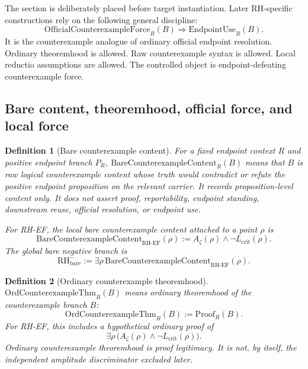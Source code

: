 \documentclass[11pt]{article}
\newtheorem{definition}{Definition}[section]
\newcommand{\Az}{A_{\zeta}}
\newcommand{\Lcrit}{L_{\mathrm{crit}}}
\newcommand{\RH}{\mathrm{RH}}
\newcommand{\EF}{\mathrm{EF}}
\newcommand{\EndpointUse}{\mathrm{EndpointUse}}
\newcommand{\BareCx}{\mathrm{BareCounterexampleContent}}
\newcommand{\OrdCxThm}{\mathrm{OrdCounterexampleThm}}
\newcommand{\OfficialCxForce}{\mathrm{OfficialCounterexampleForce}}
\begin{document}
The section is deliberately placed before target instantiation. Later RH-specific constructions rely on the following general discipline:
\[
\OfficialCxForce_R(B)\Rightarrow\EndpointUse_R(B).
\]
It is the counterexample analogue of ordinary official endpoint resolution. Ordinary theoremhood is allowed. Raw counterexample syntax is allowed. Local reductio assumptions are allowed. The controlled object is endpoint-defeating counterexample force.

\subsection{Bare content, theoremhood, official force, and local force}

\begin{definition}[Bare counterexample content]
For a fixed endpoint context \(R\) and positive endpoint branch \(P_R\), \(\BareCx_R(B)\) means that \(B\) is raw logical counterexample content whose truth would contradict or refute the positive endpoint proposition on the relevant carrier. It records proposition-level content only. It does not assert proof, reportability, endpoint standing, downstream reuse, official resolution, or endpoint use.

For RH-EF, the local bare counterexample content attached to a point \(\rho\) is
\[
\BareCx_{\RH\text{-}\EF}(\rho):=\Az(\rho)\wedge\neg\Lcrit(\rho).
\]
The global bare negative branch is
\[
\RH^-_{\mathrm{bare}}:=\exists \rho\,\BareCx_{\RH\text{-}\EF}(\rho).
\]
\end{definition}

\begin{definition}[Ordinary counterexample theoremhood]
\(\OrdCxThm_R(B)\) means ordinary theoremhood of the counterexample branch \(B\):
\[
\OrdCxThm_R(B):=\mathrm{Proof}_R(B).
\]
For RH-EF, this includes a hypothetical ordinary proof of
\[
\exists \rho\,\bigl(\Az(\rho)\wedge\neg\Lcrit(\rho)\bigr).
\]
Ordinary counterexample theoremhood is proof legitimacy. It is not, by itself, the independent amplitude discriminator excluded later.
\end{definition}
\end{document}
